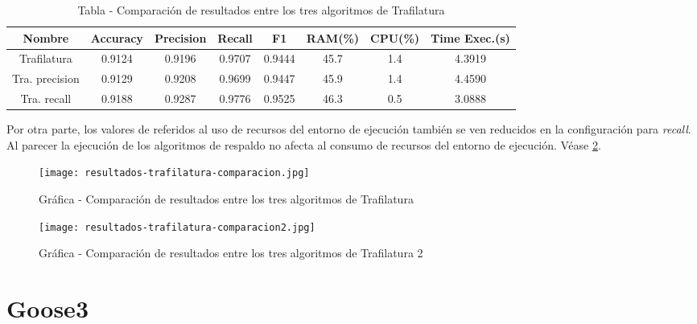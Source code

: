 \begin{table}[h]
    \begin{center}
      \begin{tabular}{| c | c | c | c | c | c | c | c |} \hline 
       \textbf{Nombre} & \textbf{Accuracy} & \textbf{Precision}  & \textbf{Recall} & \textbf{F1} & \textbf{RAM(\%)} & \textbf{CPU(\%)} & \textbf{Time Exec.(s)} \\ \hline
       Trafilatura & 0.9124 & 0.9196 & 0.9707 & 0.9444 & 45.7 & 1.4 & 4.3919 \\ \hline
       Tra. precision & 0.9129 & 0.9208 & 0.9699 & 0.9447 & 45.9 & 1.4 & 4.4590 \\ \hline
       Tra. recall & 0.9188 & 0.9287 & 0.9776 & 0.9525 & 46.3 & 0.5 & 3.0888 \\ \hline
      \end{tabular}
      \caption{Tabla - Comparación de resultados entre los tres algoritmos de Trafilatura}
      \label{tab:tabla - comparacion de resultados entre los tres algoritmos de trafilatura}
    \end{center}
\end{table}

Por otra parte, los valores de referidos al uso de recursos del entorno de ejecución también se ven
reducidos en la configuración para \emph{recall}. Al parecer la ejecución de los algoritmos de respaldo no
afecta al consumo de recursos del entorno de ejecución. Véase 
\ref{img:grafica - comparacion de resultados entre los tres algoritmos de trafilatura 2}.

\begin{figure}[tphb]
    \centering
    \texttt{[image: resultados-trafilatura-comparacion.jpg]}
    \caption{Gráfica - Comparación de resultados entre los tres algoritmos de Trafilatura}
    \label{img:grafica - comparacion de resultados entre los tres algoritmos de trafilatura}
\end{figure}

\begin{figure}[tphb]
    \centering
    \texttt{[image: resultados-trafilatura-comparacion2.jpg]}
    \caption{Gráfica - Comparación de resultados entre los tres algoritmos de Trafilatura 2}
    \label{img:grafica - comparacion de resultados entre los tres algoritmos de trafilatura 2}
\end{figure}

\section*{Goose3}

